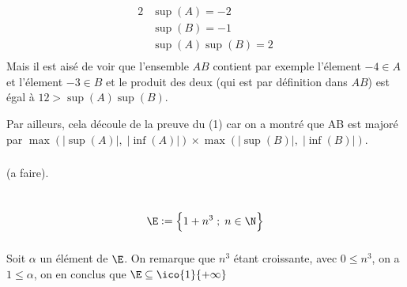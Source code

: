 \begin{alignat*}{2}
&\sup(A) = -2 \\
&\sup(B) = -1 \\
&\sup(A)\sup(B) = 2 \\
\end{alignat*}
Mais il est aisé de voir que l'ensemble \(AB\) contient par exemple l'élement \(-4 \in A\) et l'élement \(-3 \in B\) et le produit des deux (qui est par définition dans \(AB\)) est égal à \(12 > \sup(A)\sup(B)\).\<

Par ailleurs, cela découle de la preuve du (1) car on a montré que AB est majoré par \(\max(|\sup(A)|, \;|\inf(A)|) \times \max(|\sup(B)|, \;|\inf(B)|)\).

\subsubsection*{}

(a faire).
\pagebreak

\section[Exercices]{}

\subsection[Etude d'ensembles]{}
\[
   \E:= \Bigl\{ 1 + n^3 \; ; \; n \in \N \Bigl\}
\]

\subsubsection*{}

Soit \(\alpha\) un élément de \(\E\).\+
On remarque que \(n^3\) étant croissante, avec \(0 \leq n^3\), on a \(1 \leq \alpha\), on en conclus que \(\E \subseteq \ico{1}{+\infty}\)

